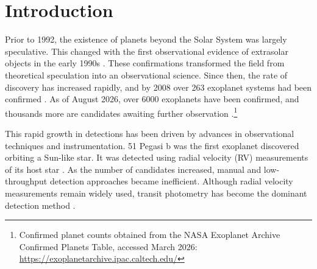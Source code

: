 \newpage{}
\begin{abstract}
    The use of convolutional neural networks (CNN) to analyse patterns in transiting exoplanets has been observed as an upcoming method in filtering false positive signals. However, for best results, papers focus on preprocessing and cleaning the data heavily to make classification easier on the model. This paper focuses on improving the model to handle Kepler raw data for classification. Using lightly processed data, a binary and multiclass CNN were developed to classify light curves from Kepler as transit or shallow/deep eclipsing binaries. The binary model showed impressive results with \textbf{(How much)}\% accuracy score while the multiclass model had an accuracy of \textbf{(What score?)}\%. The main distinction comes from the tricky nature of shallow eclipsing binaries which are very common in observation. This research focuses on the developing process of using machine learning models to search for exoplanets with minimal manual processing requirements.
\end{abstract}

\section{Introduction}

Prior to 1992, the existence of planets beyond the Solar System was largely speculative. This changed with the first observational evidence of extrasolar objects in the early 1990s \citep{First_Exoplanet, First_Exoplanet_RV}. These confirmations transformed the field from theoretical speculation into an observational science. Since then, the rate of discovery has increased rapidly, and by 2008 over 263 exoplanet systems had been confirmed \citep{Exoplanet_numbers_2008}. As of August 2026, over 6000 exoplanets have been confirmed, and thousands more are candidates awaiting further observation \citep{christiansen2025nasaexoplanetarchiveexoplanet}.\footnote{Confirmed planet counts obtained from the NASA Exoplanet Archive Confirmed Planets Table, accessed March 2026: \url{https://exoplanetarchive.ipac.caltech.edu/}}

This rapid growth in detections has been driven by advances in observational techniques and instrumentation. 51 Pegasi b was the first exoplanet discovered orbiting a Sun-like star. It was detected using radial velocity (RV) measurements of its host star \citep{First_Exoplanet_RV}. As the number of candidates increased, manual and low-throughput detection approaches became inefficient. Although radial velocity measurements remain widely used, transit photometry has become the dominant detection method \citep{How_Many_Transits}.

